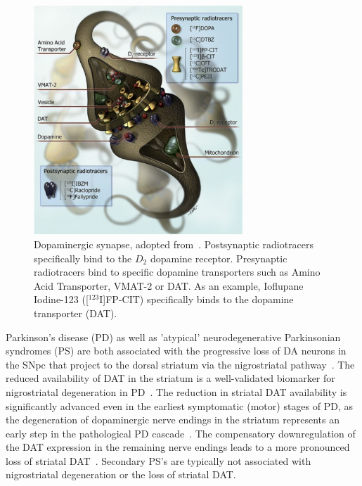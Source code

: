 \begin{figure}[ht]
  \centering
  \includegraphics[width=0.7\textwidth]{content/figures/da_synapse.png}
  \caption{Dopaminergic synapse, adopted from~\cite{Booij2008-hh}.
  Postsynaptic radiotracers specifically bind to the $D_2$ dopamine receptor. 
  Presynaptic radiotracers bind to specific dopamine transporters such as Amino Acid Transporter, VMAT-2 or DAT.
  As an example, Ioflupane Iodine-123 ([$^{123}$I]FP-CIT) specifically binds to the dopamine transporter (DAT).} 
  \label{fig:dat_tracer_synapse}
\end{figure}

Parkinson's disease (PD) as well as 'atypical' neurodegenerative Parkinsonian syndromes (PS) 
are both associated with the progressive loss of DA neurons in the SNpc 
that project to the dorsal striatum via the nigrostriatal pathway~\citep{Piggott1999}.
The reduced availability of DAT in the striatum is a well-validated biomarker 
for nigrostriatal degeneration in PD~\citep{Bernheimer1973, Fazio2018, Niznik1991}.
The reduction in striatal DAT availability is significantly advanced even in the earliest symptomatic (motor) stages of PD, 
as the degeneration of dopaminergic nerve endings in the striatum represents 
an early step in the pathological PD cascade~\citep{Bernheimer1973, Fazio2018, Niznik1991}.
The compensatory downregulation of the DAT expression in the remaining nerve endings 
leads to a more pronounced loss of striatal DAT~\citep{Lee2000, Saari2017, Honkanen2019}.
Secondary PS's are typically not associated with nigrostriatal degeneration or the loss of striatal DAT. 

